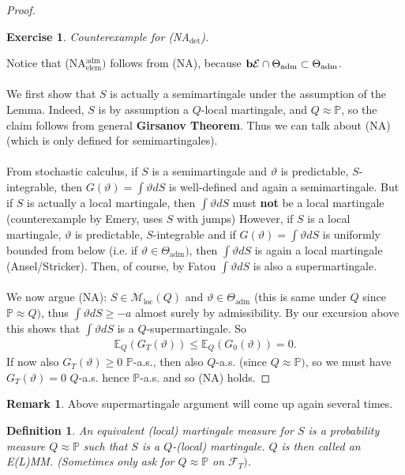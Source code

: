 \documentclass[12pt,a4paper, twoside]{article}
\newtheorem{defn}{Definition}[section]
\newtheorem{exe}{Exercise}[section]
\theoremstyle{definition}
\newtheorem{rem}{Remark}[section]
\newcommand{\EE}{\mathbb{E}} %
\newcommand{\PP}{\mathbb{P}} %
\newcommand{\simple}{\textbf{\text{b}}\mathcal{E}}
\begin{document}
\begin{proof} \
\begin{exe} Counterexample for (NA$_\text{det}$). 
\end{exe}
\noindent Notice that (NA$_\text{elem}^\text{adm})$ follows from (NA), because $\simple \cap \Theta_\text{adm} \subset \Theta_\text{adm}$. \\
\\
We first show that $S$ is actually a semimartingale under the assumption of the Lemma. Indeed, $S$ is by assumption a $Q$-local martingale, and $Q \approx \PP$, so the claim follows from general \textbf{Girsanov Theorem}. Thus we can talk about (NA) (which is only defined for semimartingales).
\\\\
From stochastic calculus, if $S$ is a semimartingale and $\vartheta$ is predictable, $S$-integrable, then $G( \vartheta)= \int \vartheta dS$ is well-defined and again a semimartingale. But if $S$ is actually a local martingale,  then $\int \vartheta dS$ must \textbf{not} be a local martingale (counterexample by Emery, uses $S$ with jumps)
\newpage
However, if $S$ is a local martingale, $\vartheta$ is predictable, $S$-integrable and if $G( \vartheta)= \int \vartheta dS$ is uniformly bounded from below (i.e. if $\vartheta \in \Theta_\text{adm})$, then $\int \vartheta dS$ is again a local martingale (Ansel/Stricker). Then, of course, by Fatou $\int \vartheta dS$ is also a supermartingale. 
\\\\
We now argue (NA): $S \in \mathcal{M}_\text{loc}(Q)$ and $\vartheta \in \Theta_\text{adm}$ (this is same under $Q$ since $\PP \approx Q)$,  thus $\int \vartheta dS \geq -a$ almost surely by admissibility. By our excursion above this shows that $\int \vartheta dS$ is a $Q$-supermartingale. So
\begin{align*}
\EE_Q(G_T( \vartheta)) \leq \EE_Q(G_0( \vartheta))=0.
\end{align*}
If now also $G_T( \vartheta) \geq 0$ $\PP$-a.s., then also $Q$-a.s. (since $Q \approx \PP)$, so we must have $G_T( \vartheta)=0$ $Q$-a.s. hence $\PP$-a.s. and so (NA) holds. 
\end{proof}
\begin{rem} Above supermartingale argument will come up again several times. 
\end{rem}
\begin{defn} An equivalent (local) martingale measure for $S$ is a probability measure $Q \approx \PP$ such that $S$ is a $Q$-(local) martingale. $Q$ is then called an E(L)MM. (Sometimes only ask for $Q \approx \PP$ on $\mathcal{F}_T)$. 
\end{defn}
\end{document}
